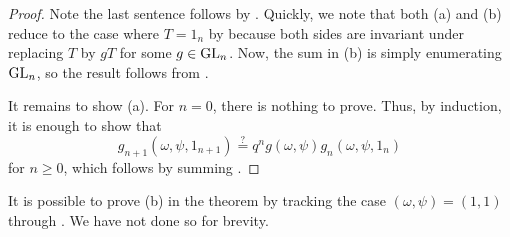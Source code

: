 \begin{proof}
    Note the last sentence follows by . Quickly, we note that both (a) and (b) reduce to the case where $T=1_n$ by  because both sides are invariant under replacing $T$ by $gT$ for some $g\in\mathrm{GL}_n$. Now, the sum in (b) is simply enumerating $\mathrm{GL}_n$, so the result follows from \cite[Proposition~7.1.1]{hach-gf}.

    It remains to show (a). For $n=0$, there is nothing to prove. Thus, by induction, it is enough to show that
    \[g_{n+1}(\omega,\psi,1_{n+1})\stackrel?=q^ng(\omega,\psi)g_n(\omega,\psi,1_n)\]
    for $n\ge0$, which follows by summing .
\end{proof}
\begin{remark}
    It is possible to prove (b) in the theorem by tracking the case $(\omega,\psi)=(1,1)$ through . We have not done so for brevity.
\end{remark}
